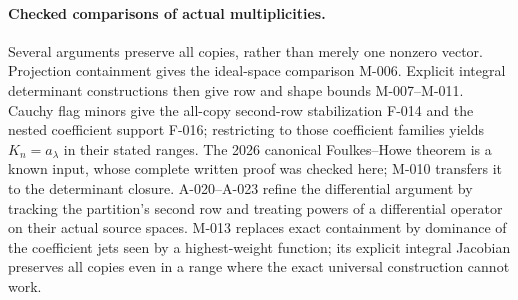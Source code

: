 \documentclass[11pt]{article}
\begin{document}
\paragraph{Checked comparisons of actual multiplicities.}
Several arguments preserve all copies, rather than merely one
nonzero vector. Projection containment gives the ideal-space
comparison M-006. Explicit integral determinant constructions
then give row and shape bounds M-007--M-011. Cauchy flag minors
give the all-copy second-row stabilization F-014 and the nested
coefficient support F-016; restricting to those coefficient
families yields \(K_n=a_\lambda\) in their stated ranges.
The 2026 canonical Foulkes--Howe theorem is a known input, whose
complete written proof was checked here; M-010 transfers it to
the determinant closure. A-020--A-023 refine the differential
argument by tracking the partition's second row and treating powers
of a differential operator on their actual source spaces.
M-013 replaces exact containment by dominance of the coefficient
jets seen by a highest-weight function; its explicit integral
Jacobian preserves all copies even in a range where the exact
universal construction cannot work.
\end{document}
